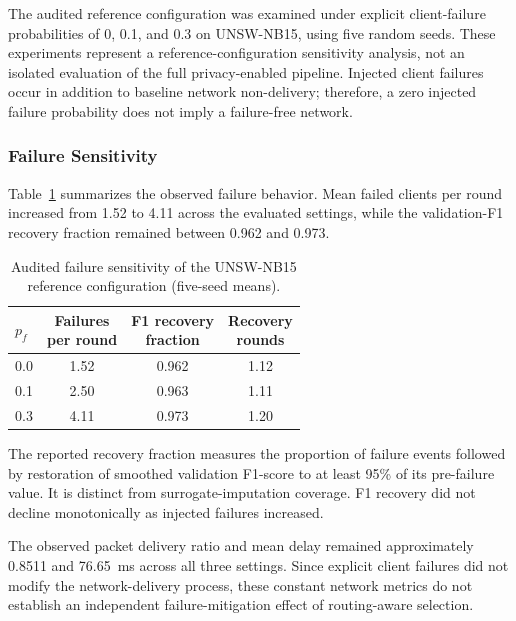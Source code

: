 \documentclass[5p,times,numafflabel]{elsarticle}
\begin{document}
The audited reference configuration was examined under
explicit client-failure probabilities of 0, 0.1, and 0.3
on UNSW-NB15, using five random seeds. These experiments
represent a reference-configuration sensitivity analysis,
not an isolated evaluation of the full privacy-enabled
pipeline. Injected client failures occur in addition to
baseline network non-delivery; therefore, a zero injected
failure probability does not imply a failure-free network.

\subsubsection{Failure Sensitivity}
\label{subsubsec:failure-resilience}

Table~\ref{tab:failure-sensitivity} summarizes the observed
failure behavior. Mean failed clients per round increased
from 1.52 to 4.11 across the evaluated settings, while
the validation-F1 recovery fraction remained between
0.962 and 0.973.

\begin{table}[!tbp]
	\caption{Audited failure sensitivity of the UNSW-NB15
		reference configuration (five-seed means).}
	\label{tab:failure-sensitivity}
	\centering
	\footnotesize
	\setlength{\tabcolsep}{4pt}
	\begin{tabular}{@{}lccc@{}}
		\toprule
		$p_f$ &
		\shortstack{Failures\\per round} &
		\shortstack{F1 recovery\\fraction} &
		\shortstack{Recovery\\rounds} \\
		\midrule
		0.0 & 1.52 & 0.962 & 1.12 \\
		0.1 & 2.50 & 0.963 & 1.11 \\
		0.3 & 4.11 & 0.973 & 1.20 \\
		\bottomrule
	\end{tabular}
\end{table}

The reported recovery fraction measures the proportion
of failure events followed by restoration of smoothed
validation F1-score to at least 95\% of its pre-failure
value. It is distinct from surrogate-imputation coverage.
F1 recovery did not decline monotonically as injected
failures increased.

The observed packet delivery ratio and mean delay
remained approximately 0.8511 and 76.65~ms across
all three settings. Since explicit client failures did
not modify the network-delivery process, these constant
network metrics do not establish an independent
failure-mitigation effect of routing-aware selection.
\end{document}
